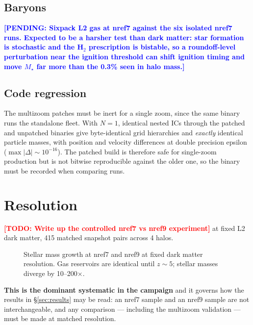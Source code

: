 \documentclass[twocolumn,linenumbers]{aastex631}
\newcommand{\todo}[1]{\textcolor{red}{\textbf{[TODO: #1]}}}
\newcommand{\pending}[1]{\textcolor{blue}{\textbf{[PENDING: #1]}}}
\newcommand{\measured}[1]{#1}
\newcommand{\Mstar}{\ensuremath{M_\star}}
\begin{document}
\subsection{Baryons}
\label{sec:gas-audit}

\pending{Sixpack L2 gas at nref7 against the six isolated nref7 runs.
Expected to be a harsher test than dark matter: star formation is stochastic
and the H$_2$ prescription is bistable, so a roundoff-level perturbation near
the ignition threshold can shift ignition timing and move \Mstar{} far more
than the 0.3\% seen in halo mass.}

\subsection{Code regression}
\label{sec:regression}

The multizoom patches must be inert for a single zoom, since the same binary
runs the standalone fleet. With $N=1$, identical nested ICs through the
patched and unpatched binaries give byte-identical grid hierarchies and
\emph{exactly} identical particle masses, with position and velocity
differences at double precision epsilon
(\measured{$\max |\Delta| \sim 10^{-16}$}).
The patched build is therefore safe for single-zoom production but is not
bitwise reproducible against the older one, so the binary must be recorded
when comparing runs.

\section{Resolution}
\label{sec:resolution}

\todo{Write up the controlled nref7 vs nref9 experiment} at fixed L2 dark
matter, \measured{415} matched snapshot pairs across \measured{4} halos.

\begin{figure}
\caption{Stellar mass growth at nref7 and nref9 at fixed dark matter
resolution. Gas reservoirs are identical until $z \sim 5$; stellar masses
diverge by \measured{10--200$\times$}.}
\label{fig:resolution}
\end{figure}

\textbf{This is the dominant systematic in the campaign} and it governs how
the results in \S\ref{sec:results} may be read: an nref7 sample and an nref9
sample are not interchangeable, and any comparison --- including the
multizoom validation --- must be made at matched resolution.
\end{document}
